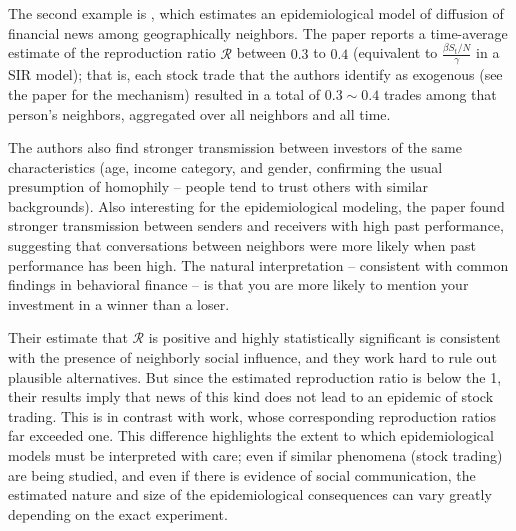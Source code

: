 The second example is \href{https://github.com/iworld1991/EpiExp/blob/master/Literature/huang2021rate.pdf}{ \cite{huang2021rate}}, which estimates an epidemiological model of diffusion of financial news among geographically neighbors. The paper reports a time-average estimate of the reproduction ratio $\mathcal{R}$ between $0.3$ to $0.4$ (equivalent to $\frac{\beta S_t/N}{\gamma}$ in a SIR model); that is, each stock trade that the authors identify as exogenous (see the paper for the mechanism) resulted in a total of $0.3{\sim}0.4$ trades among that person's neighbors, aggregated over all neighbors and all time.

The authors also find stronger transmission between investors of the same characteristics (age, income category, and gender, confirming the usual presumption of homophily -- people tend to trust others with similar backgrounds). Also interesting for the epidemiological modeling, the paper found stronger transmission between senders and receivers with high past performance, suggesting that conversations between neighbors were more likely when past performance has been high.  The natural interpretation -- consistent with common findings in behavioral finance -- is that you are more likely to mention your investment in a winner than a loser.

Their estimate that $\mathcal{R}$ is positive and highly statistically significant is consistent with the presence of neighborly social influence, and they work hard to rule out plausible alternatives. But since the estimated reproduction ratio is below the 1, their results imply that news of this kind does not lead to an epidemic of stock trading.  This is in contrast with \cite{shiller1989survey} work, whose corresponding reproduction ratios far exceeded one.  This difference highlights the extent to which epidemiological models must be interpreted with care; even if similar phenomena (stock trading) are being studied, and even if there is evidence of social communication, the estimated nature and size of the epidemiological consequences can vary greatly depending on the exact experiment.

